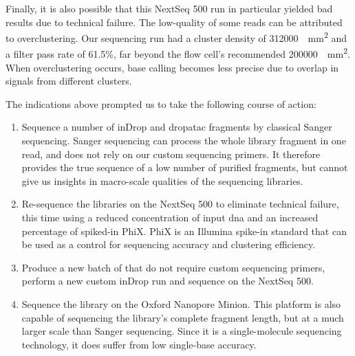Finally, it is also possible that this NextSeq 500 run in particular yielded bad results due to technical failure. The low-quality of some reads can be attributed to overclustering. Our sequencing run had a cluster density of \SI{312 000}{\per\mm\squared} and a filter pass rate of 61.5\%, far beyond the flow cell's recommended \SI{200 000}{\per\mm\squared}. When overclustering occurs, base calling becomes less precise due to overlap in signals from different clusters.\pms



The indications above prompted us to take the following course of action:
\begin{enumerate}
\item Sequence a number of inDrop and \acrshort{dropatac} fragments by classical Sanger sequencing. Sanger sequencing can process the whole library fragment in one read, and does not rely on our custom sequencing primers. It therefore provides the true sequence of a low number of purified fragments, but cannot give us insights in macro-scale qualities of the sequencing libraries.
\item Re-sequence the libraries on the NextSeq 500 to eliminate technical failure, this time using a reduced concentration of input \acrshort{dna} and an increased percentage of spiked-in PhiX. PhiX is an Illumina spike-in standard that can be used as a control for sequencing accuracy and clustering efficiency.
\item Produce a new batch of  that do not require custom sequencing primers, perform a new custom inDrop run and sequence on the NextSeq 500.
\item Sequence the library on the Oxford Nanopore Minion. This platform is also capable of sequencing the library's complete fragment length, but at a much larger scale than Sanger sequencing. Since it is a single-molecule sequencing technology, it does suffer from low single-base accuracy.
\end{enumerate}


